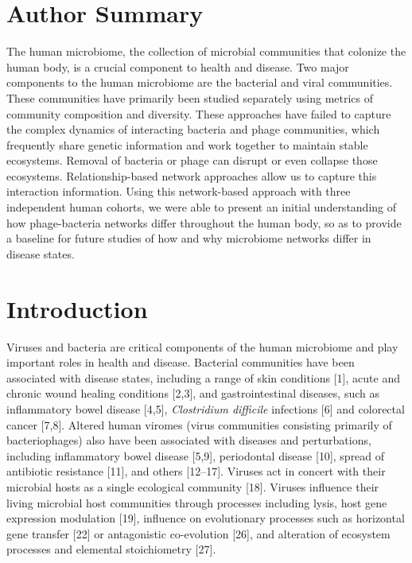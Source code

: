 \documentclass[12pt,]{article}
\begin{document}
\newpage

\section{Author Summary}\label{author-summary}

The human microbiome, the collection of microbial communities that
colonize the human body, is a crucial component to health and disease.
Two major components to the human microbiome are the bacterial and viral
communities. These communities have primarily been studied separately
using metrics of community composition and diversity. These approaches
have failed to capture the complex dynamics of interacting bacteria and
phage communities, which frequently share genetic information and work
together to maintain stable ecosystems. Removal of bacteria or phage can
disrupt or even collapse those ecosystems. Relationship-based network
approaches allow us to capture this interaction information. Using this
network-based approach with three independent human cohorts, we were
able to present an initial understanding of how phage-bacteria networks
differ throughout the human body, so as to provide a baseline for future
studies of how and why microbiome networks differ in disease states.

\newpage

\section{Introduction}\label{introduction}

Viruses and bacteria are critical components of the human microbiome and
play important roles in health and disease. Bacterial communities have
been associated with disease states, including a range of skin
conditions {[}1{]}, acute and chronic wound healing conditions
{[}2,3{]}, and gastrointestinal diseases, such as inflammatory bowel
disease {[}4,5{]}, \emph{Clostridium difficile} infections {[}6{]} and
colorectal cancer {[}7,8{]}. Altered human viromes (virus communities
consisting primarily of bacteriophages) also have been associated with
diseases and perturbations, including inflammatory bowel disease
{[}5,9{]}, periodontal disease {[}10{]}, spread of antibiotic resistance
{[}11{]}, and others {[}12--17{]}. Viruses act in concert with their
microbial hosts as a single ecological community {[}18{]}. Viruses
influence their living microbial host communities through processes
including lysis, host gene expression modulation {[}19{]}, influence on
evolutionary processes such as horizontal gene transfer {[}22{]} or
antagonistic co-evolution {[}26{]}, and alteration of ecosystem
processes and elemental stoichiometry {[}27{]}.
\end{document}
